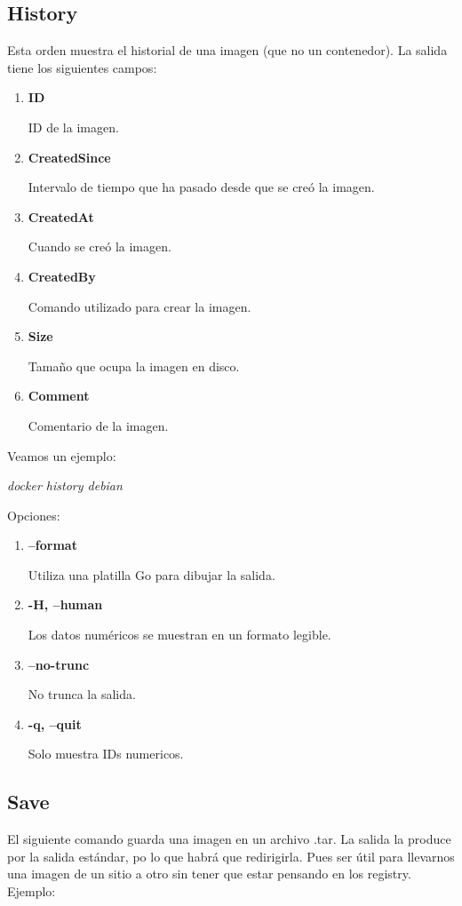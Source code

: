 \documentclass[]{article}
\begin{document}
\subsection{History}

Esta orden muestra el historial de una imagen (que no un contenedor).
La salida tiene los siguientes campos:

\begin{enumerate}
	\item \textbf{ID}
	
	ID de la imagen.
	\item \textbf{CreatedSince}
	
	Intervalo de tiempo que ha pasado desde que se creó la imagen.
	\item \textbf{CreatedAt}
	
	Cuando se creó la imagen.
	\item \textbf{CreatedBy}
	
	Comando utilizado para crear la imagen.
	\item \textbf{Size}
	
	Tamaño que ocupa la imagen en disco.
	\item \textbf{Comment}
	
	Comentario de la imagen.
\end{enumerate}

Veamos un ejemplo:

\begin{center}
\it	
docker history debian
\end{center}

Opciones:
\begin{enumerate}
\renewcommand{\labelenumi}{$\bullet$}

\item \textbf{--format}

Utiliza una platilla Go para dibujar la salida.
\item \textbf{-H, --human}

Los datos numéricos se muestran en un formato legible.
\item \textbf{--no-trunc}

No trunca la salida.
\item \textbf{-q, --quit}

Solo muestra IDs numericos.
\end{enumerate}



\subsection{Save}
El siguiente comando guarda una imagen en un archivo .tar. La salida la produce por la salida estándar, po lo que habrá que redirigirla.
Pues ser útil para llevarnos una imagen de un sitio a otro sin tener que estar pensando en los registry.
Ejemplo:
\end{document}
